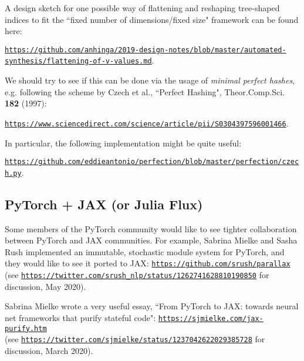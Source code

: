 \documentclass{article}
\begin{document}
A design sketch for one possible way of flattening and reshaping
tree-shaped indices to fit the ``fixed number of dimensions/fixed size" framework can be found
here:

\hspace{0.3in}\href{https://github.com/anhinga/2019-design-notes/blob/master/automated-synthesis/flattening-of-v-values.md}
{\footnotesize\tt https://github.com/anhinga/2019-design-notes/blob/master/automated-synthesis/flattening-of-v-values.md}.

We should try to see if this can be done via the usage of {\em minimal perfect hashes}, e.g.
following the scheme by Czech et al., ``Perfect Hashing", Theor.Comp.Sci. {\bf 182} (1997):

\hspace{0.3in}\href{https://www.sciencedirect.com/science/article/pii/S0304397596001466}
{\tt https://www.sciencedirect.com/science/article/pii/S0304397596001466}.

In particular, the following implementation might be quite useful:

\hspace{0.3in}\href{https://github.com/eddieantonio/perfection/blob/master/perfection/czech.py}
{\tt https://github.com/eddieantonio/perfection/blob/master/perfection/czech.py}.

\subsection{PyTorch + JAX (or Julia Flux)}

Some members of the PyTorch community would like to see tighter collaboration between PyTorch and JAX
communities. For example, Sabrina Mielke and Sasha Rush implemented an immutable, stochastic module system for
PyTorch, and they would like to see it ported to JAX: \href{https://github.com/srush/parallax}{\tt https://github.com/srush/parallax} (see \href{https://twitter.com/srush\_nlp/status/1262741628810190850}{\tt https://twitter.com/srush\_nlp/status/1262741628810190850} for discussion, May 2020).

Sabrina Mielke wrote a very useful essay, ``From PyTorch to JAX: towards neural net frameworks that purify stateful code": \href{https://sjmielke.com/jax-purify.htm}{\tt https://sjmielke.com/jax-purify.htm}\\ (see
\href{https://twitter.com/sjmielke/status/1237042622029385728}{\tt https://twitter.com/sjmielke/status/1237042622029385728} for discussion, March 2020).
\end{document}
